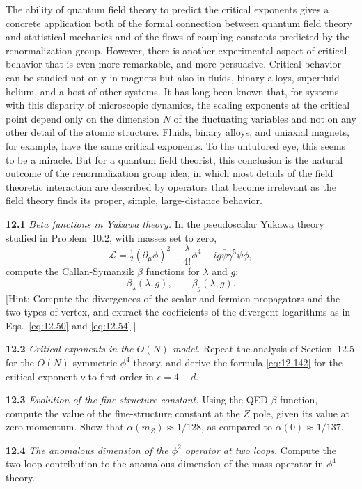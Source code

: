 The ability of quantum field theory to predict the critical exponents gives a
concrete application both of the formal connection between quantum field
theory and statistical mechanics and of the flows of coupling constants
predicted by the renormalization group.  However, there is another
experimental aspect of critical behavior that is even more remarkable, and
more persuasive.  Critical behavior can be studied not only in magnets but
also in fluids, binary alloys, superfluid helium, and a host of other systems.
It has long been known that, for systems with this disparity of microscopic
dynamics, the scaling exponents at the critical point depend only on the
dimension $N$ of the fluctuating variables and not on any other detail of
the atomic structure.  Fluids, binary alloys, and uniaxial magnets, for
example, have the same critical exponents.  To the untutored eye, this seems
to be a miracle.  But for a quantum field theorist, this conclusion is the
natural outcome of the renormalization group idea, in which most details of
the field theoretic interaction are described by operators that become
irrelevant as the field theory finds its proper, simple, large-distance
behavior.

\problems

\textbf{12.1} \emph{Beta functions in Yukawa theory.}  In the pseudoscalar
Yukawa theory studied in Problem~10.2, with masses set to zero,
\begin{equation}
  \mathcal{L} = \tfrac{1}{2}(\partial_\mu\phi)^2 - \frac{\lambda}{4!}\phi^4
    - ig\bar{\psi}\gamma^5\psi\phi ,
\end{equation}
compute the Callan-Symanzik $\beta$ functions for $\lambda$ and $g$:
\begin{equation}
  \beta_\lambda(\lambda, g),\qquad \beta_g(\lambda, g) .
\end{equation}
[Hint: Compute the divergences of the scalar and fermion propagators and the
two types of vertex, and extract the coefficients of the divergent logarithms
as in Eqs.~\eqref{eq:12.50} and \eqref{eq:12.54}.]

\textbf{12.2} \emph{Critical exponents in the $O(N)$ model.}  Repeat the
analysis of Section~12.5 for the $O(N)$-symmetric $\phi^4$ theory, and derive
the formula \eqref{eq:12.142} for the critical exponent $\nu$ to first order
in $\epsilon = 4-d$.

\textbf{12.3} \emph{Evolution of the fine-structure constant.}  Using the QED
$\beta$ function, compute the value of the fine-structure constant at the
$Z$ pole, given its value at zero momentum.  Show that
$\alpha(m_Z) \approx 1/128$, as compared to $\alpha(0) \approx 1/137$.

\textbf{12.4} \emph{The anomalous dimension of the $\phi^2$ operator at two
loops.}  Compute the two-loop contribution to the anomalous dimension of the
mass operator in $\phi^4$ theory.

